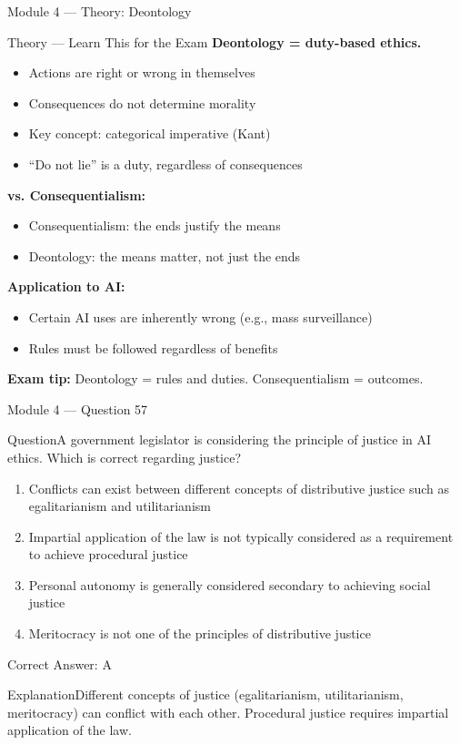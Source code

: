 \documentclass[aspectratio=169,10pt]{beamer}
\newcommand{\question}[1]{\begin{block}{Question}#1\end{block}}
\newcommand{\options}[4]{%
	\begin{enumerate}[label=\Alph*.,leftmargin=*]
		\item #1
		\item #2
		\item #3
		\item #4
	\end{enumerate}
}
\newcommand{\answerbox}[1]{\begin{exampleblock}{Correct Answer: #1}\end{exampleblock}}
\newcommand{\explain}[1]{\begin{block}{Explanation}#1\end{block}}
\newcommand{\theory}[1]{%
	\begin{block}{Theory --- Learn This for the Exam}
		\small #1
	\end{block}
}
\begin{document}
	\begin{frame}{Module 4 --- Theory: Deontology}
		\theory{
			\textbf{Deontology = duty-based ethics.}
			\begin{itemize}
				\item Actions are right or wrong in themselves
				\item Consequences do not determine morality
				\item Key concept: categorical imperative (Kant)
				\item ``Do not lie'' is a duty, regardless of consequences
			\end{itemize}
			\textbf{vs. Consequentialism:}
			\begin{itemize}
				\item Consequentialism: the ends justify the means
				\item Deontology: the means matter, not just the ends
			\end{itemize}
			\textbf{Application to AI:}
			\begin{itemize}
				\item Certain AI uses are inherently wrong (e.g., mass surveillance)
				\item Rules must be followed regardless of benefits
			\end{itemize}
			\textbf{Exam tip:} Deontology = rules and duties. Consequentialism = outcomes.
		}
	\end{frame}
	
	\begin{frame}{Module 4 --- Question 57}
		\question{A government legislator is considering the principle of justice in AI ethics. Which is correct regarding justice?}
		\options{Conflicts can exist between different concepts of distributive justice such as egalitarianism and utilitarianism}{Impartial application of the law is not typically considered as a requirement to achieve procedural justice}{Personal autonomy is generally considered secondary to achieving social justice}{Meritocracy is not one of the principles of distributive justice}
		\answerbox{A}
		\explain{Different concepts of justice (egalitarianism, utilitarianism, meritocracy) can conflict with each other. Procedural justice requires impartial application of the law.}
	\end{frame}
	
\end{document}
